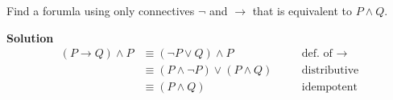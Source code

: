 \begin{tcolorbox}[title=Problem 9, breakable]
Find a forumla using only connectives $\neg$ and $\rightarrow$ that is equivalent to 
$P \wedge Q$.
\end{tcolorbox}

\textbf{Solution}
\begin{align*}
(P \rightarrow Q) \wedge P &\equiv (\neg P \vee Q) \wedge P && \quad \text{def. of $\rightarrow$}\\
&\equiv (P \wedge \neg P) \vee (P \wedge Q) && \quad \text{distributive} \\
&\equiv (P \wedge Q) && \quad \text{idempotent}
\end{align*}
